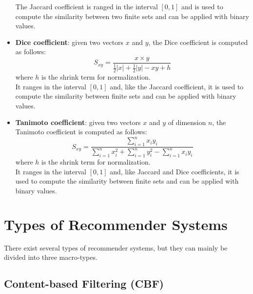\begin{itemize}
The Jaccard coefficient is ranged in the interval $[0, 1]$ and is used to compute the similarity between two finite sets and can be applied with binary values.
\item \textbf{Dice coefficient}: given two vectors $x$ and $y$, the Dice coefficient is computed as follows:
\begin{equation*}
S_{xy} = \frac{x \times y}{\frac{1}{2}|x| + \frac{1}{2}|y| - xy + h}
\end{equation*}
where $h$ is the shrink term for normalization.\\
It ranges in the interval $[0, 1]$ and, like the Jaccard coefficient, it is used to compute the similarity between finite sets and can be applied with binary values.
\item \textbf{Tanimoto coefficient}: given two vectors $x$ and $y$ of dimension $n$, the Tanimoto coefficient is computed as follows:
\begin{equation*}
S_{xy} = \frac{\sum_{i = 1}^{n} x_iy_i}{\sum_{i = 1}^{n} x_i^2 + \sum_{i = 1}^{n} y_i^2 - \sum_{i = 1}^{n} x_iy_i}
\end{equation*}
where $h$ is the shrink term for normalization.\\
It ranges in the interval $[0, 1]$ and, like Jaccard and Dice coefficients, it is used to compute the similarity between finite sets and can be applied with binary values.
\end{itemize}



\section{Types of Recommender Systems}

There exist several types of recommender systems, but they can mainly be divided into three macro-types.


\subsection{Content-based Filtering (CBF)}

